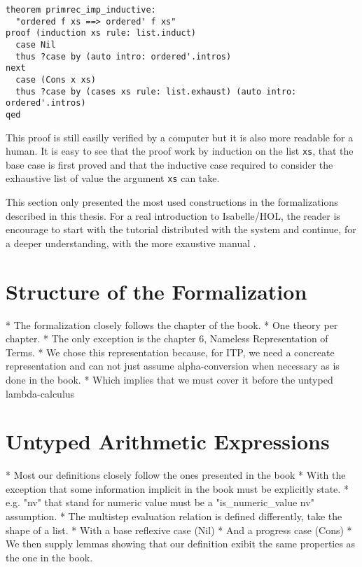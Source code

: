 \documentclass[a4paper, oneside, 12pt, titlepage]{article}
\begin{document}
\begin{verbatim}
theorem primrec_imp_inductive:
  "ordered f xs ==> ordered' f xs"
proof (induction xs rule: list.induct)
  case Nil
  thus ?case by (auto intro: ordered'.intros)
next
  case (Cons x xs)
  thus ?case by (cases xs rule: list.exhaust) (auto intro: ordered'.intros)
qed
\end{verbatim}

This proof is still easilly verified by a computer but it is also more readable for a human. It is
easy to see that the proof work by induction on the list \texttt{xs}, that the base case is first
proved and that the inductive case required to consider the exhaustive list of value the argument
\texttt{xs} can take.

This section only presented the most used constructions in the formalizations described in this
thesis. For a real introduction to Isabelle/HOL, the reader is encourage to start with the tutorial
\cite{???} distributed with the system and continue, for a deeper understanding, with the more
exaustive manual \cite{???}.

\section{Structure of the Formalization}
\label{sec:structure-of-formalization}

  * The formalization closely follows the chapter of the book.
    * One theory per chapter.
    * The only exception is the chapter 6, Nameless Representation of Terms.
      * We chose this representation because, for ITP, we need a concreate representation and can
        not just assume alpha-conversion when necessary as is done in the book.
      * Which implies that we must cover it before the untyped lambda-calculus

\section{Untyped Arithmetic Expressions}
\label{sec:untyped-arith-expr}

  * Most our definitions closely follow the ones presented in the book
    * With the exception that some information implicit in the book must be explicitly state.
      * e.g. "nv" that stand for numeric value must be a "is\_numeric\_value nv" assumption.
    * The multistep evaluation relation is defined differently, take the shape of a list.
      * With a base reflexive case (Nil)
      * And a progress case (Cons)
      * We then supply lemmas showing that our definition exibit the same properties as the one in
        the book.
\end{document}

